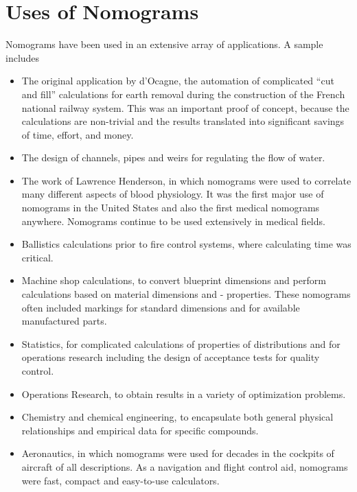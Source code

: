 \documentclass[a4paper,11pt,english]{sphinxmanual}
\begin{document}
\section{Uses of Nomograms}
\label{introduction/introduction:uses-of-nomograms}
Nomograms have been used in an extensive array of applications. A sample includes
\begin{itemize}
\item {} 
The original application by d'Ocagne, the automation of complicated ``cut and fill'' calculations for earth removal during the construction of the French national railway system. This was an important proof of concept, because the calculations are non-trivial and the results translated into significant savings of time, effort, and money.

\item {} 
The design of channels, pipes and weirs for regulating the flow of water.

\item {} 
The work of Lawrence Henderson, in which nomograms were used to correlate many different aspects of blood physiology. It was the first major use of nomograms in the United States and also the first medical nomograms anywhere. Nomograms continue to be used extensively in medical fields.

\item {} 
Ballistics calculations prior to fire control systems, where calculating time was critical.

\item {} 
Machine shop calculations, to convert blueprint dimensions and perform calculations based on material dimensions and - properties. These nomograms often included markings for standard dimensions and for available manufactured parts.

\item {} 
Statistics, for complicated calculations of properties of distributions and for operations research including the design of acceptance tests for quality control.

\item {} 
Operations Research, to obtain results in a variety of optimization problems.

\item {} 
Chemistry and chemical engineering, to encapsulate both general physical relationships and empirical data for specific compounds.

\item {} 
Aeronautics, in which nomograms were used for decades in the cockpits of aircraft of all descriptions. As a navigation and flight control aid, nomograms were fast, compact and easy-to-use calculators.


\end{itemize}
\end{document}
